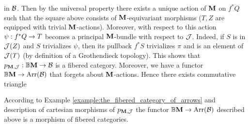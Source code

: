 in ${\mathcal B}$. Then by the universal property there exists a unique action of $\mathbf{M}$ on $f^*Q$ such that the square above consists of $\mathbf{M}$-equivariant morphisms ($T,Z$ are equipped with trivial $\mathbf{M}$-actions). Moreover, with respect to this action $\psi:f^*Q\rightarrow T$ becomes a principal $\mathbf{M}$-bundle with respect to ${\mathcal J}$. Indeed, if $S$ is in ${\mathcal J}(Z)$ and $S$ trivializes $\psi$, then its pullback $f^*S$ trivializes $\pi$ and is an element of ${\mathcal J}(T)$ (by definition of a Grothendieck topology). This shows that $p_{\mathbf{M},{\mathcal J}}:\mathbb{B}\mathbf{M}\rightarrow {\mathcal B}$ is a fibered category. Moreover, we have a functor $\mathbb{B}\mathbf{M}\rightarrow \mathrm{Arr}({\mathcal B})$ that forgets about $\mathbf{M}$-actions. Hence there exists commutative triangle
\begin{center}
\end{center}
According to Example \ref{example:the_fibered_category_of_arrows} and description of cartesian morphisms of $p_{\mathbf{M},{\mathcal J}}$ the functor $\mathbb{B}\mathbf{M}\rightarrow \mathrm{Arr}({\mathcal B})$ described above is a morphism of fibered categories.

